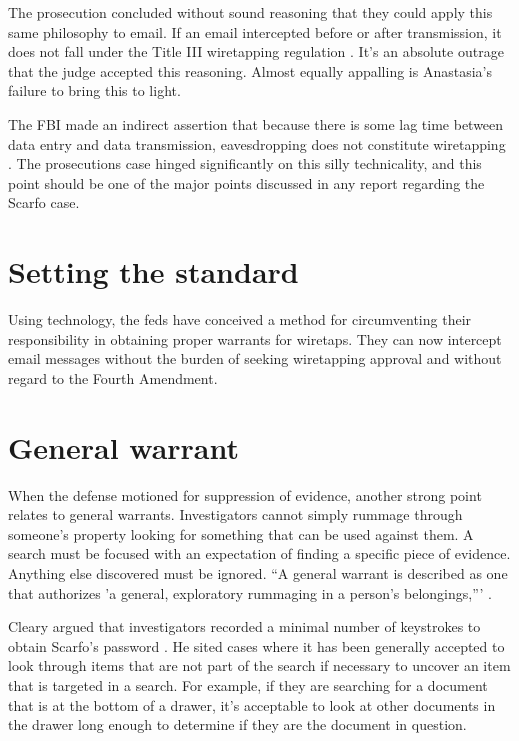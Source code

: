 \documentclass[12pt,titlepage]{article}             %
\begin{document}
  The prosecution concluded without sound reasoning that they could
  apply this same philosophy to email.  If an email intercepted before
  or after transmission, it does not fall under the Title III
  wiretapping regulation \cite{CLEARY}.  It's an absolute outrage that
  the judge accepted this reasoning.  Almost equally appalling is
  Anastasia's failure to bring this to light.
  
  The FBI made an indirect assertion that because there is some lag
  time between data entry and data transmission, eavesdropping does not
  constitute wiretapping \cite{CLEARY}.  The prosecutions case hinged
  significantly on this silly technicality, and this point should be
  one of the major points discussed in any report regarding the Scarfo
  case.

  \section{Setting the standard}

  Using technology, the feds have conceived a method for circumventing
  their responsibility in obtaining proper warrants for wiretaps.
  They can now intercept email messages without the burden of seeking
  wiretapping approval and without regard to the Fourth Amendment.  

  \section{General warrant}

  When the defense motioned for suppression of evidence, another
  strong point relates to general warrants.  Investigators cannot
  simply rummage through someone's property looking for something that
  can be used against them.  A search must be focused with an
  expectation of finding a specific piece of evidence.  Anything else
  discovered must be ignored.  ``A general warrant is described as one
  that authorizes 'a general, exploratory rummaging in a person's
  belongings,''' \cite{GELMAN}.
  
  Cleary argued that investigators recorded a minimal number of
  keystrokes to obtain Scarfo's password \cite[p.20]{CLEARY}.  He
  sited cases where it has been generally accepted to look through
  items that are not part of the search if necessary to uncover an
  item that is targeted in a search.  For example, if they are
  searching for a document that is at the bottom of a drawer, it's
  acceptable to look at other documents in the drawer long enough to
  determine if they are the document in question.
\end{document}
